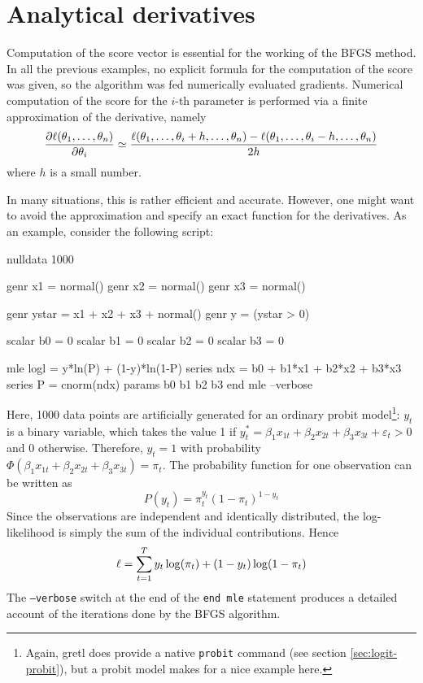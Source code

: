 \section{Analytical derivatives}
\label{sec:anal-der}

Computation of the score vector is essential for the working of the
BFGS method. In all the previous examples, no explicit formula for the
computation of the score was given, so the algorithm was fed
numerically evaluated gradients. Numerical computation of the score for
the $i$-th parameter is performed via a finite approximation of the
derivative, namely
\[
  \frac{\partial \ell(\theta_1, \ldots, \theta_n)}{\partial \theta_i} \simeq 
  \frac{\ell(\theta_1, \ldots, \theta_i + h, \ldots, \theta_n) -
    \ell(\theta_1, \ldots, \theta_i - h, \ldots, \theta_n)}{2h}
\]
where $h$ is a small number. 

In many situations, this is rather efficient and accurate. However,
one might want to avoid the approximation and specify an exact
function for the derivatives. As an example, consider the following
script:
%
\begin{code}
nulldata 1000

genr x1 = normal()
genr x2 = normal()
genr x3 = normal()

genr ystar = x1 + x2 + x3 + normal()
genr y = (ystar > 0)

scalar b0 = 0
scalar b1 = 0
scalar b2 = 0
scalar b3 = 0

mle logl = y*ln(P) + (1-y)*ln(1-P)
  series ndx = b0 + b1*x1 + b2*x2 + b3*x3
  series P = cnorm(ndx)
  params b0 b1 b2 b3
end mle --verbose
\end{code}

Here, 1000 data points are artificially generated for an ordinary
probit model\footnote{Again, gretl does provide a native
  \texttt{probit} command (see section \ref{sec:logit-probit}), but a
  probit model makes for a nice example here.}: $y_t$ is a binary
variable, which takes the value 1 if $y_t^* = \beta_1 x_{1t} + \beta_2
x_{2t} + \beta_3 x_{3t} + \varepsilon_t > 0$ and 0 otherwise.
Therefore, $y_t = 1$ with probability $\Phi(\beta_1 x_{1t} + \beta_2
x_{2t} + \beta_3 x_{3t}) = \pi_t$.  The probability function for one
observation can be written as
\[
  P(y_t) = \pi_t^{y_t} ( 1 -\pi_t )^{1-y_t}
\]
Since the observations are independent and identically distributed,
the log-likelihood is simply the sum of the individual
contributions. Hence
\[
  \ell = \sum_{t=1}^T y_t \log(\pi_t) + (1 - y_t) \log(1 - \pi_t)
\]
The \texttt{--verbose} switch at the end of the \texttt{end mle}
statement produces a detailed account of the iterations done by the
BFGS algorithm.

